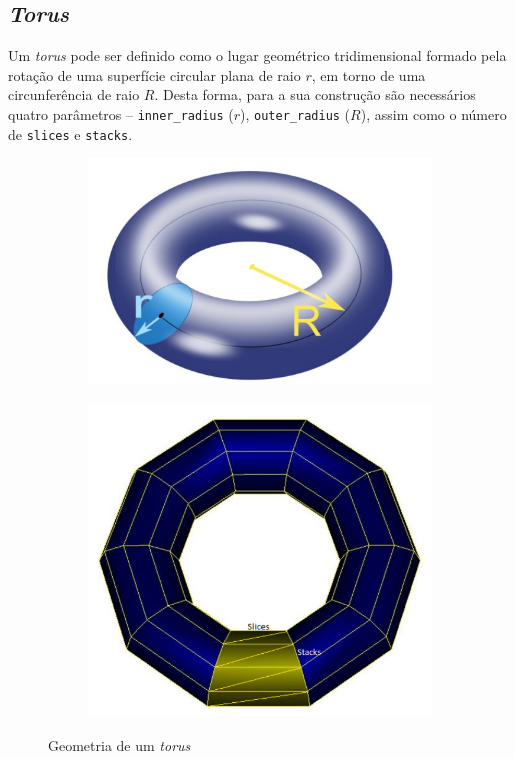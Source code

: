 \documentclass[a4paper, 11pt]{article}
\begin{document}
\subsection{\textit{Torus}}

Um \textit{torus} pode ser definido como o lugar geométrico tridimensional formado
pela rotação de uma superfície circular plana de raio $r$, em torno de uma circunferência
de raio $R$. Desta forma, para a sua construção são necessários quatro parâmetros -- 
\texttt{inner\_radius} ($r$),
\texttt{outer\_radius} ($R$), assim como o número de \texttt{slices} e \texttt{stacks}.

\begin{figure}[H]
\centering
\begin{subfigure}{.45\textwidth}
    \centering
    \includegraphics[width=\textwidth]{img/torus.png}
\end{subfigure}%
\begin{subfigure}{.5\textwidth}
    \centering
    \includegraphics[width=\textwidth]{img/torus_1.png}
\end{subfigure}
\caption{Geometria de um \textit{torus}}
\end{figure}
\end{document}
